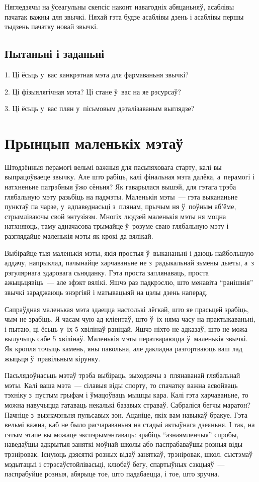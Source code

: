 Нягледзячы на ўсеагульны скепсіс наконт навагодніх абяцаньняў, асаблівы пачатак важны для звычкі. Няхай гэта будзе асаблівы дзень і асаблівы першы тыдзень пачатку новай звычкі.

\subsection*{Пытаньні і заданьні}

1. Ці ёсьць у~вас канкрэтная мэта для фармаваньня звычкі?

2. Ці фізыялягічная мэта? Ці стане ў~вас на яе рэсурсаў?

3. Ці ёсьць у~вас плян у~пісьмовым дэталізаваным выглядзе?


\section{Прынцып маленькіх мэтаў}

Штодзённыя перамогі вельмі важныя для пасьпяховага старту, калі вы выпрацоўваеце звычку. Але што рабіць, калі фінальная мэта далёка, а~перамогі і натхненьне патрэбныя ўжо сёньня? Як гаварылася вышэй, для гэтага трэба глябальную мэту разьбіць на падмэты. Маленькія мэты~--- гэта выкананьне пунктаў па чарзе, у~адпаведнасьці з~плянам, прычым ня ў~поўным аб'ёме, стрымліваючы свой энтузіязм. Многіх людзей маленькія мэты ня моцна натхняюць, таму адначасова трымайце ў~розуме сваю глябальную мэту і разглядайце маленькія мэты як крокі да вялікай.

Выбірайце тыя маленькія мэты, якія простыя ў~выкананьні і даюць найбольшую аддачу, напрыклад, пачынайце харчаваньне не з~радыкальнай зьмены дыеты, а~з рэгулярнага здаровага сьняданку. Гэта проста заплянаваць, проста ажыцьцявіць~--- але эфэкт вялікі. Яшчэ раз падкрэслю, што менавіта ``ранішнія'' звычкі зараджаюць энэргіяй і матывацыяй на цэлы дзень наперад.

Сапраўдная маленькая мэта здаецца настолькі лёгкай, што яе прасьцей зрабіць, чым не зрабіць. Я часам чую ад кліентаў, што ў~іх няма часу на практыкаваньні, і пытаю, ці ёсьць у~іх 5 хвілінаў раніцай. Яшчэ ніхто не адказаў, што не можа вылучыць сабе 5 хвілінаў. Маленькія мэты ператвараюцца ў~маленькія звычкі. Як кропля точыць камень, яны павольна, але дакладна разгортваюць ваш лад жыцьця ў~правільным кірунку.

Пасьлядоўнасьць мэтаў трэба выбіраць, зыходзячы з~плянаванай глябальнай мэты. Калі ваша мэта~--- сілавыя віды спорту, то спачатку важна асвойваць тэхніку з~пустым грыфам і ўмацоўваць мышцы кара. Калі гэта харчаваньне, то можна навучыцца гатаваць некалькі базавых страваў. Сабраліся бегчы маратон? Пачніце з~вызначэньня пульсавых зон. Ацаніце, якіх вам навыкаў бракуе. Гэта вельмі важна, каб не было расчараваньня на стадыі актыўнага дзеяньня. І так, на гэтым этапе вы можаце экспэрымэнтаваць: зрабіць ``азнаямленчыя'' спробы, наведаўшы адкрытыя заняткі моўнай школы або паспрабаваўшы розныя віды трэніровак. Існуюць дзясяткі розных відаў заняткаў, трэніровак, школ, сыстэмаў мэдытацыі і стрэсаўстойлівасьці, клюбаў бегу, спартыўных сэкцыяў~--- паспрабуйце розныя, абярыце тое, што падабаецца, і тое, што зручна.

